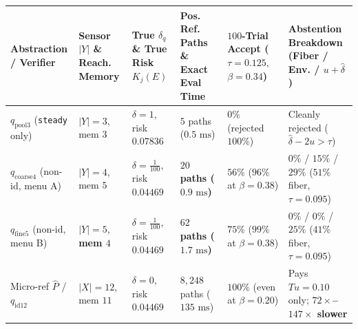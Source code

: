 \documentclass[11pt,a4paper]{article}
\newcounter{none}
\begin{document}
{\def\LTcaptype{none} %
\begin{longtable}[]{@{}
  >{\raggedright\arraybackslash}p{}
  >{\raggedright\arraybackslash}p{}
  >{\raggedright\arraybackslash}p{}
  >{\raggedright\arraybackslash}p{}
  >{\raggedright\arraybackslash}p{}
  >{\raggedright\arraybackslash}p{}@{}}
\toprule\noalign{}
\begin{minipage}[b]{\linewidth}\raggedright
Abstraction / Verifier
\end{minipage} & \begin{minipage}[b]{\linewidth}\raggedright
Sensor \(\lvert Y\rvert\) \& Reach. Memory
\end{minipage} & \begin{minipage}[b]{\linewidth}\raggedright
True \(\delta_q\) \& True Risk \(K_j(E)\)
\end{minipage} & \begin{minipage}[b]{\linewidth}\raggedright
Pos. Ref. Paths \& Exact Eval Time
\end{minipage} & \begin{minipage}[b]{\linewidth}\raggedright
\(100\)-Trial Accept (\(\tau{=}0.125,\) \(\beta{=}0.34\))
\end{minipage} & \begin{minipage}[b]{\linewidth}\raggedright
Abstention Breakdown (Fiber / Env. / \(u{+}\widehat{\delta}\))
\end{minipage} \\
\midrule\noalign{}
\endhead
\bottomrule\noalign{}
\endlastfoot
\(q_{\mathrm{pool3}}\) (\texttt{steady} only) & \(\lvert Y\rvert=3\),
mem \(3\) & \(\delta=1\), risk \(0.07836\) & \(5\) paths
(\(0.5\text{ ms}\)) & \(0\%\) (rejected \(100\%\)) & Cleanly rejected
(\(\widehat{\delta}-2u > \tau\)) \\
\(q_{\mathrm{coarse4}}\) (non-id, menu A) & \(\lvert Y\rvert=4\), mem
\(5\) & \(\delta=\frac{1}{100}\), risk \(0.04469\) & \textbf{\(20\)
paths (\(0.9\text{ ms}\))} & \textbf{\(56\%\)} (\(96\%\) at
\(\beta{=}0.38\)) & \(0\%\) / \(15\%\) / \(29\%\) (\(51\%\) fiber,
\(\tau{=}0.095\)) \\
\(q_{\mathrm{fine5}}\) (non-id, menu B) & \(\lvert Y\rvert=5\),
\textbf{mem \(4\)} & \(\delta=\frac{1}{100}\), risk \(0.04469\) &
\textbf{\(62\) paths (\(1.7\text{ ms}\))} & \textbf{\(75\%\)} (\(99\%\)
at \(\beta{=}0.38\)) & \(0\%\) / \(0\%\) / \(25\%\) (\(41\%\) fiber,
\(\tau{=}0.095\)) \\
Micro-ref \(\widehat{P}\) / \(q_{\mathrm{id12}}\) &
\(\lvert X\rvert=12\), mem \(11\) & \(\delta=0\), risk \(0.04469\) &
\(8{,}248\) paths (\(135\text{ ms}\)) & \(100\%\) (even at
\(\beta{=}0.20\)) & Pays \(Tu=0.10\) only;
\textbf{\(72\times\)--\(147\times\) slower} \\
\end{longtable}
}
\end{document}
